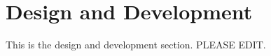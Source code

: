 \section{Design and Development}
\label{designanddevelopment}

This is the design and development section. PLEASE EDIT.